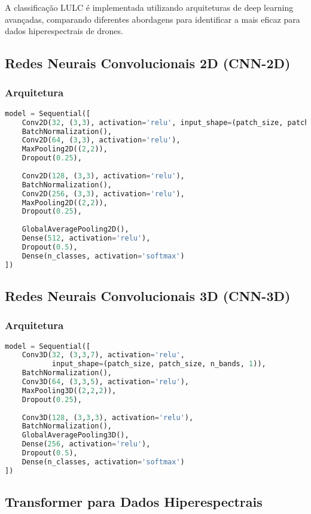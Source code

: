 A classificação LULC é implementada utilizando arquiteturas de deep learning avançadas, comparando diferentes abordagens para identificar a mais eficaz para dados hiperespectrais de drones.

\subsection{Redes Neurais Convolucionais 2D (CNN-2D)}
\subsubsection{Arquitetura}
\begin{lstlisting}[language=Python, caption=Arquitetura CNN-2D]
model = Sequential([
    Conv2D(32, (3,3), activation='relu', input_shape=(patch_size, patch_size, n_bands)),
    BatchNormalization(),
    Conv2D(64, (3,3), activation='relu'),
    MaxPooling2D((2,2)),
    Dropout(0.25),
    
    Conv2D(128, (3,3), activation='relu'),
    BatchNormalization(),
    Conv2D(256, (3,3), activation='relu'),
    MaxPooling2D((2,2)),
    Dropout(0.25),
    
    GlobalAveragePooling2D(),
    Dense(512, activation='relu'),
    Dropout(0.5),
    Dense(n_classes, activation='softmax')
])
\end{lstlisting}

\subsection{Redes Neurais Convolucionais 3D (CNN-3D)}
\subsubsection{Arquitetura}
\begin{lstlisting}[language=Python, caption=Arquitetura CNN-3D]
model = Sequential([
    Conv3D(32, (3,3,7), activation='relu', 
           input_shape=(patch_size, patch_size, n_bands, 1)),
    BatchNormalization(),
    Conv3D(64, (3,3,5), activation='relu'),
    MaxPooling3D((2,2,2)),
    Dropout(0.25),
    
    Conv3D(128, (3,3,3), activation='relu'),
    BatchNormalization(),
    GlobalAveragePooling3D(),
    Dense(256, activation='relu'),
    Dropout(0.5),
    Dense(n_classes, activation='softmax')
])
\end{lstlisting}

\subsection{Transformer para Dados Hiperespectrais}
